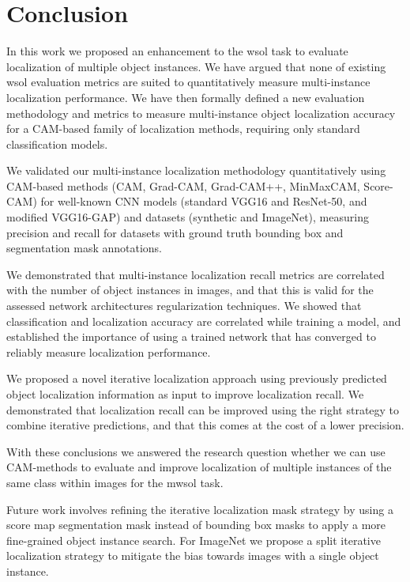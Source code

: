 \chapter{Conclusion} \label{ch:conclusion}

In this work we proposed an enhancement to the \acrlong{wsol} task to evaluate localization of multiple object instances. We have argued that none of existing \acrshort{wsol} evaluation metrics are suited to quantitatively measure multi-instance localization performance. We have then formally defined a new evaluation methodology and metrics to measure multi-instance object localization accuracy for a CAM-based family of localization methods, requiring only standard classification models.

We validated our multi-instance localization methodology quantitatively using CAM-based methods (CAM, Grad-CAM, Grad-CAM++, MinMaxCAM, Score-CAM) for well-known CNN models (standard VGG16 and ResNet-50, and modified VGG16-GAP) and datasets (synthetic and ImageNet), measuring precision and recall for datasets with ground truth bounding box and segmentation mask annotations.

We demonstrated that multi-instance localization recall metrics are correlated with the number of object instances in images, and that this is valid for the assessed network architectures regularization techniques. We showed that classification and localization accuracy are correlated while training a model, and established the importance of using a trained network that has converged to reliably measure localization performance.

We proposed a novel iterative localization approach using previously predicted object localization information as input to improve localization recall. We demonstrated that localization recall can be improved using the right strategy to combine iterative predictions, and that this comes at the cost of a lower precision.

With these conclusions we answered the research question whether we can use CAM-methods to evaluate and improve localization of multiple instances of the same class within images for the \acrshort{mwsol} task.

Future work involves refining the iterative localization mask strategy by using a score map segmentation mask instead of bounding box masks to apply a more fine-grained object instance search. For ImageNet we propose a split iterative localization strategy to mitigate the bias towards images with a single object instance.
